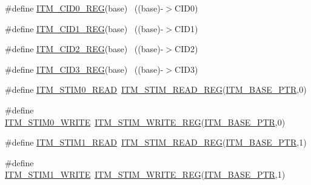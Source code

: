 \begin{DoxyCompactItemize}
\item 
\#define \hyperlink{group___i_t_m___register___accessor___macros_ga0c80f56059755478a7d1bc62ef67a9e3}{I\+T\+M\+\_\+\+C\+I\+D0\+\_\+\+R\+EG}(base)                                          ~((base)-\/$>$C\+I\+D0)
\item 
\#define \hyperlink{group___i_t_m___register___accessor___macros_ga68959e3c73327037ca6c037197dc655e}{I\+T\+M\+\_\+\+C\+I\+D1\+\_\+\+R\+EG}(base)                                          ~((base)-\/$>$C\+I\+D1)
\item 
\#define \hyperlink{group___i_t_m___register___accessor___macros_ga5ea3ee7db440781e970bf3eb97d55673}{I\+T\+M\+\_\+\+C\+I\+D2\+\_\+\+R\+EG}(base)                                          ~((base)-\/$>$C\+I\+D2)
\item 
\#define \hyperlink{group___i_t_m___register___accessor___macros_gade0a6ba9d22485697b0889409b4cc976}{I\+T\+M\+\_\+\+C\+I\+D3\+\_\+\+R\+EG}(base)                                          ~((base)-\/$>$C\+I\+D3)
\item 
\#define \hyperlink{group___i_t_m___register___accessor___macros_ga41eefae93b44a2616fd9feac9188bd5b}{I\+T\+M\+\_\+\+S\+T\+I\+M0\+\_\+\+R\+E\+AD}~\hyperlink{group___i_t_m___register___accessor___macros_ga5009882336aadcd4f37b45cf3395c450}{I\+T\+M\+\_\+\+S\+T\+I\+M\+\_\+\+R\+E\+A\+D\+\_\+\+R\+EG}(\hyperlink{group___i_t_m___peripheral_gafaddee8fe8b6a898d4e5edc43ee0d703}{I\+T\+M\+\_\+\+B\+A\+S\+E\+\_\+\+P\+TR},0)
\item 
\#define \hyperlink{group___i_t_m___register___accessor___macros_gac29b16f3533cac91bfa55b3ed6a9e14d}{I\+T\+M\+\_\+\+S\+T\+I\+M0\+\_\+\+W\+R\+I\+TE}~\hyperlink{group___i_t_m___register___accessor___macros_ga049ca92a4e78e77c19af81e51aa73f1c}{I\+T\+M\+\_\+\+S\+T\+I\+M\+\_\+\+W\+R\+I\+T\+E\+\_\+\+R\+EG}(\hyperlink{group___i_t_m___peripheral_gafaddee8fe8b6a898d4e5edc43ee0d703}{I\+T\+M\+\_\+\+B\+A\+S\+E\+\_\+\+P\+TR},0)
\item 
\#define \hyperlink{group___i_t_m___register___accessor___macros_ga0539c5b663891628a5157b9e06be3327}{I\+T\+M\+\_\+\+S\+T\+I\+M1\+\_\+\+R\+E\+AD}~\hyperlink{group___i_t_m___register___accessor___macros_ga5009882336aadcd4f37b45cf3395c450}{I\+T\+M\+\_\+\+S\+T\+I\+M\+\_\+\+R\+E\+A\+D\+\_\+\+R\+EG}(\hyperlink{group___i_t_m___peripheral_gafaddee8fe8b6a898d4e5edc43ee0d703}{I\+T\+M\+\_\+\+B\+A\+S\+E\+\_\+\+P\+TR},1)
\item 
\#define \hyperlink{group___i_t_m___register___accessor___macros_gadb4269a2c1aae622c11d8e38853bf0d3}{I\+T\+M\+\_\+\+S\+T\+I\+M1\+\_\+\+W\+R\+I\+TE}~\hyperlink{group___i_t_m___register___accessor___macros_ga049ca92a4e78e77c19af81e51aa73f1c}{I\+T\+M\+\_\+\+S\+T\+I\+M\+\_\+\+W\+R\+I\+T\+E\+\_\+\+R\+EG}(\hyperlink{group___i_t_m___peripheral_gafaddee8fe8b6a898d4e5edc43ee0d703}{I\+T\+M\+\_\+\+B\+A\+S\+E\+\_\+\+P\+TR},1)

\end{DoxyCompactItemize}
